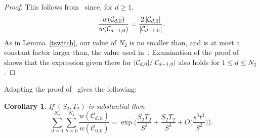 \documentclass[12pt]{article}
\newtheorem{corollary}[theorem]{Corollary}
\numberwithin{equation}{section}
\def\C{{\mathcal{C}}}
\def\ac#1{\card{\C_{#1}}}
\begin{document}
\begin{proof}
This follows from~\cite[Lemma 4.8]{GMW} since, for $d\geq 1$,
\[ \frac{w(\C_{d,0})}{w(\C_{d-1,0})} =\frac{2\,\ac{d,0}}{\ac{d-1,0}}. 
\]
As in Lemma~\ref{tswitch}, our value of $N_2$ is no smaller than, and is
at most a constant factor larger than, the value used
in~\cite{GMW}.  Examination of the proof of~\cite[Lemma 4.8]{GMW} shows
that the expression given there for $\ac{d,0}/\ac{d-1,0}$ also holds for
$1\leq d\leq N_2$.
\end{proof}

\bigskip
Adapting the proof of~\cite[Corollary 4.9]{GMW} gives the following:

\begin{corollary}
\label{dsum}
If $(S_2,T_2)$ is substantial then
\[ \sum_{d=0}^{N_2}\sum_{h=0}^{N_3} \frac{w(\C_{d,h})}{w(\C_{0,0})}
=
\exp\biggl( \frac{S_2T_2}{S^2} + \frac{S_2T_2}{S^3} 
                + O\biggl(\frac{s^3t^3}{S^2}\biggr) \biggr).
\]
\end{corollary}
\end{document}
